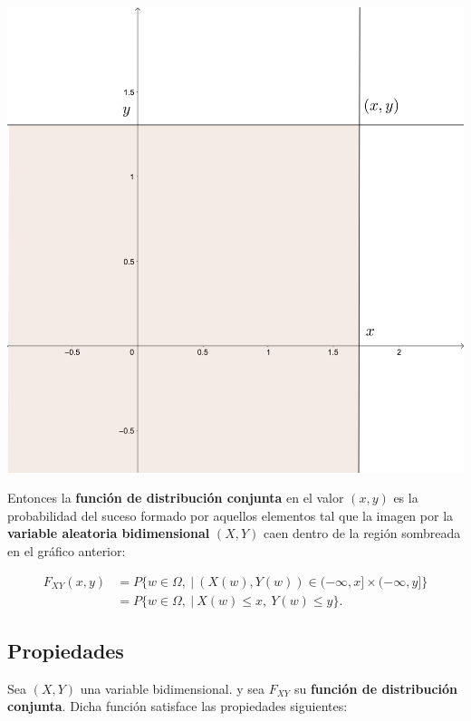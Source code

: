 \documentclass[]{book}
\begin{document}
\includegraphics{Images/Fxy.png}

Entonces la \textbf{función de distribución conjunta} en el valor \((x,y)\) es la probabilidad del suceso formado por aquellos elementos tal que la imagen por la \textbf{variable aleatoria bidimensional} \((X,Y)\) caen dentro de la región sombreada en el gráfico anterior:

\[
\begin{array}{rl}
F_{XY}(x,y) &= P\{w\in\Omega,\ |\ (X(w),Y(w))\in (-\infty,x]\times (-\infty,y]\} \\ 
&= P\{w\in\Omega,\ |\ X(w)\leq x,\ Y(w)\leq y\}.
\end{array}
\]

\hypertarget{propiedades-4}{%
\subsection{Propiedades}\label{propiedades-4}}

Sea \((X,Y)\) una variable bidimensional. y sea \(F_{XY}\) su \textbf{función de distribución conjunta}. Dicha función satisface las propiedades siguientes:
\end{document}
